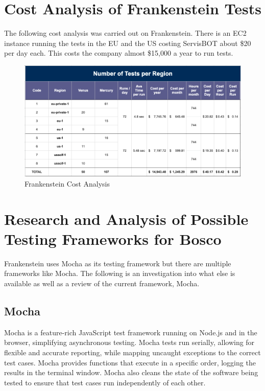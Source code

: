\documentclass[12pt,a4paper,titlepage]{report}
\begin{document}
\section{Cost Analysis of Frankenstein Tests}

The following cost analysis was carried out on Frankenstein. There is an EC2 instance running the tests in the EU and the US costing ServisBOT about \$20 per day each. This costs the company almost \$15,000 a year to run tests.

\begin{figure}[ht]
 \centering
 \includegraphics[width=\textwidth,height=\textheight,keepaspectratio]{./diagrams/frank_cost_analysis.png}
 \caption{Frankenstein Cost Analysis}
\end{figure}

\section{Research and Analysis of Possible Testing Frameworks for Bosco}

Frankenstein uses Mocha as its testing framework but there are multiple frameworks like Mocha. The following is an investigation into what else is available as well as a review of the current framework, Mocha.
\subsection{Mocha}

Mocha is a feature-rich JavaScript test framework running on Node.js and in the browser, simplifying asynchronous
testing. Mocha tests run serially, allowing for flexible and accurate reporting, while mapping uncaught
exceptions to the correct test cases. Mocha provides functions that execute in a specific order, logging the
results in the terminal window. Mocha also cleans the state of the software being tested to ensure that test
cases run independently of each other.
\end{document}
